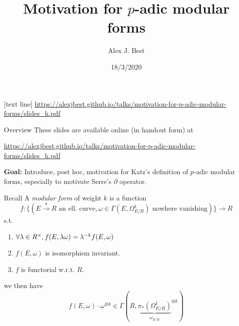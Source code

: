 \newcommand{\lb}{[}
\newcommand{\rb}{]}

\author{Alex J. Best}
\date{18/3/2020}
\title{Motivation for $p$-adic modular forms}
[text line]
{\url{https://alexjbest.github.io/talks/motivation-for-p-adic-modular-forms/slides_h.pdf}}


\begin{frame}
    \titlepage

\end{frame}


\begin{frame}{Overview}
    These slides are available online (in handout form) at

    \begin{centering}
        \url{https://alexjbest.github.io/talks/motivation-for-p-adic-modular-forms/slides_h.pdf}
    \end{centering} \pause

    \textbf{Goal:} Introduce, post hoc, motivation for Katz's definition of $p$-adic modular forms, especially to motivate Serre's $\partial$ operator.

\end{frame}

\begin{frame}{Recall}
    A \emph{modular form} of weight $k$ is a function
    \[f\colon \{(E \xrightarrow \pi R\text{ an ell.\ curve}, \omega\in \Gamma(E, \Omega^1_{E/R})\text{ nowhere vanishing})\}\to R\] \pause
    s.t.
    \begin{enumerate}
        \item \(\forall \lambda\in R^{\times},  f(E, \lambda \omega) = \lambda ^{-k} f(E, \omega)\)
        \item \(f(E, \omega)\) is isomorphism invariant.
        \item \(f\) is functorial w.r.t. $R$.
    \end{enumerate} \pause
    we then have
    \[f(E, \omega) \cdot \omega^{\otimes k} \in \Gamma(R, {\underbrace{\pi_*(\Omega^1_{E/R})}_{\underline \omega_{E/R}}}^{\otimes k})\]

\end{frame}

